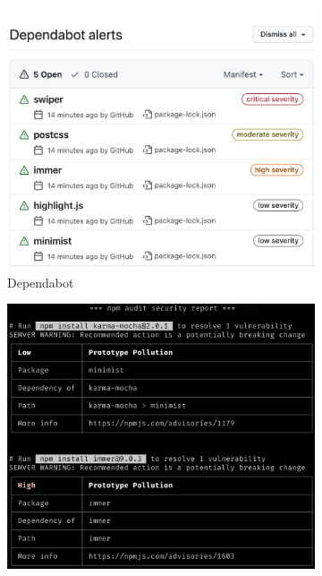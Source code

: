 \documentclass[conference]{IEEEtran}
\begin{document}
	\begin{figure}
		\centering
		\begin{subfigure}[b]{0.32\textwidth}
			\centering
			\includegraphics[width=\textwidth]{Figures/screenshot-dependabot.png}
			\caption{Dependabot}
			\label{fig:screenshot-dependabot}
		\end{subfigure}
		\hfill
		\begin{subfigure}[b]{0.32\textwidth}
			\centering
			\includegraphics[width=\textwidth]{Figures/screenshot-npm-audit2.png}

\end{subfigure}
\end{figure}
\end{document}
